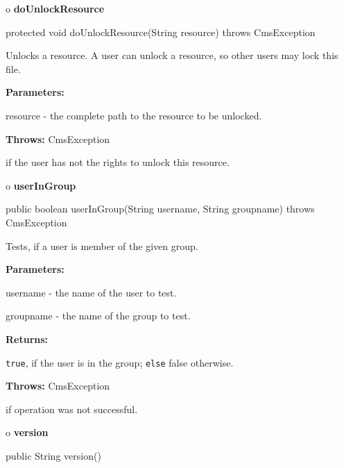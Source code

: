 o {\bf doUnlockResource} 

\begin{PRE}
 protected void doUnlockResource(String resource) throws CmsException
\end{PRE}

\begin{description}
\htmlDD Unlocks a resource. \htmlBR
A user can unlock a resource, so other users may lock this file. 

\begin{description}
\item {\bf Parameters:}  

resource - the complete path to the resource to be unlocked.  
\item {\bf Throws:} CmsException  

if the user has not the rights to unlock this resource.  
\end{description}

\end{description}

o {\bf userInGroup} 

\begin{PRE}
 public boolean userInGroup(String username,
                            String groupname) throws CmsException
\end{PRE}

\begin{description}
\htmlDD Tests, if a user is member of the given group. 

\begin{description}
\item {\bf Parameters:}  

username - the name of the user to test.  

groupname - the name of the group to test.  
\item {\bf Returns:}  

{\tt true}, if the user is in the group; {\tt else} false otherwise.  
\item {\bf Throws:} CmsException  

if operation was not successful.  
\end{description}

\end{description}

o {\bf version} 

\begin{PRE}
 public String version()
\end{PRE}

